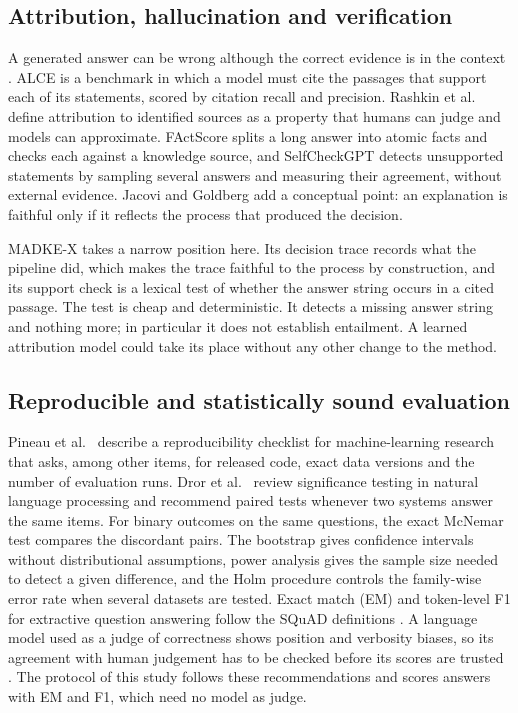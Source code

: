 \subsection{Attribution, hallucination and verification}
A generated answer can be wrong although the correct evidence is in the context \cite{ji2023hallucination}. ALCE \cite{gao2023alce} is a benchmark in which a model must cite the passages that support each of its statements, scored by citation recall and precision. Rashkin et al.~\cite{rashkin2023attribution} define attribution to identified sources as a property that humans can judge and models can approximate. FActScore \cite{min2023factscore} splits a long answer into atomic facts and checks each against a knowledge source, and SelfCheckGPT \cite{manakul2023selfcheckgpt} detects unsupported statements by sampling several answers and measuring their agreement, without external evidence. Jacovi and Goldberg \cite{jacovi2020faithful} add a conceptual point: an explanation is faithful only if it reflects the process that produced the decision.

MADKE-X takes a narrow position here. Its decision trace records what the pipeline did, which makes the trace faithful to the process by construction, and its support check is a lexical test of whether the answer string occurs in a cited passage. The test is cheap and deterministic. It detects a missing answer string and nothing more; in particular it does not establish entailment. A learned attribution model could take its place without any other change to the method.

\subsection{Reproducible and statistically sound evaluation}
Pineau et al.~\cite{pineau2021reproducibility} describe a reproducibility checklist for machine-learning research that asks, among other items, for released code, exact data versions and the number of evaluation runs. Dror et al.~\cite{dror2018hitchhiker} review significance testing in natural language processing and recommend paired tests whenever two systems answer the same items. For binary outcomes on the same questions, the exact McNemar test \cite{mcnemar1947} compares the discordant pairs. The bootstrap \cite{efron1979bootstrap} gives confidence intervals without distributional assumptions, power analysis \cite{cohen1988power} gives the sample size needed to detect a given difference, and the Holm procedure \cite{holm1979} controls the family-wise error rate when several datasets are tested. Exact match (EM) and token-level F1 for extractive question answering follow the SQuAD definitions \cite{rajpurkar2016squad}. A language model used as a judge of correctness shows position and verbosity biases, so its agreement with human judgement has to be checked before its scores are trusted \cite{zheng2023judge}. The protocol of this study follows these recommendations and scores answers with EM and F1, which need no model as judge.

